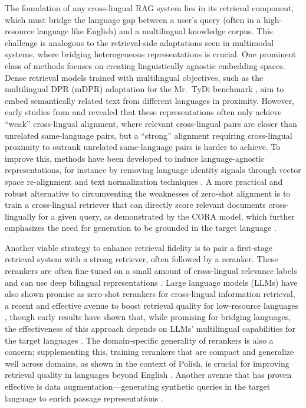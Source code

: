 \documentclass[11pt]{article}
\begin{document}
The foundation of any cross-lingual RAG system lies in its retrieval component, which must bridge the language gap between a user's query (often in a high-resource language like English) and a multilingual knowledge corpus. This challenge is analogous to the retrieval-side adaptations seen in multimodal systems, where bridging heterogeneous representations is crucial. One prominent class of methods focuses on creating linguistically agnostic embedding spaces. Dense retrieval models trained with multilingual objectives, such as the multilingual DPR (mDPR) adaptation for the Mr.~TyDi benchmark \cite{ref370}, aim to embed semantically related text from different languages in proximity. However, early studies from \cite{ref370} and \cite{ref371} revealed that these representations often only achieve ``weak'' cross-lingual alignment, where relevant cross-lingual pairs are closer than unrelated same-language pairs, but a ``strong'' alignment requiring cross-lingual proximity to outrank unrelated same-language pairs is harder to achieve. To improve this, methods have been developed to induce language-agnostic representations, for instance by removing language identity signals through vector space re-alignment and text normalization techniques \cite{ref372}. A more practical and robust alternative to circumventing the weaknesses of zero-shot alignment is to train a cross-lingual retriever that can directly score relevant documents cross-lingually for a given query, as demonstrated by the CORA model, which further emphasizes the need for generation to be grounded in the target language \cite{ref373}.

Another viable strategy to enhance retrieval fidelity is to pair a first-stage retrieval system with a strong retriever, often followed by a reranker. These rerankers are often fine-tuned on a small amount of cross-lingual relevance labels and can use deep bilingual representations \cite{ref374}. Large language models (LLMs) have also shown promise as zero-shot rerankers for cross-lingual information retrieval, a recent and effective avenue to boost retrieval quality for low-resource languages \cite{ref375}, though early results have shown that, while promising for bridging languages, the effectiveness of this approach depends on LLMs' multilingual capabilities for the target languages \cite{ref375}. The domain-specific generality of rerankers is also a concern; supplementing this, training rerankers that are compact and generalize well across domains, as shown in the context of Polish, is crucial for improving retrieval quality in languages beyond English \cite{ref53}. Another avenue that has proven effective is data augmentation---generating synthetic queries in the target language to enrich passage representations \cite{ref376,ref110}.
\end{document}

